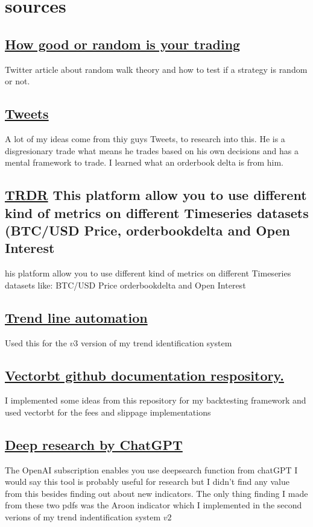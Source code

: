 \documentclass[12pt]{article}
\begin{document}
\section{sources}
{\small
\subsection{\href{https://x.com/HangukQuant/status/1930603876069335120}{How good or random is your trading}}
Twitter article about random walk theory and how to test if a strategy is random or not. 
\subsection{\href{https://x.com/abetrade/status/1941613701150188008}{Tweets}}
A lot of my ideas come from thiy guys Tweets, to research into this. He is a disgresionary trade what means he trades based on his own decisions and has a mental framework to trade. I learned what an orderbook delta is from him.
\subsection{\href{https://trdr.io/}{TRDR} This platform allow you to use different kind of metrics on different Timeseries datasets (BTC/USD Price, orderbookdelta  and Open Interest}his platform allow you to use different kind of metrics on different Timeseries datasets like: BTC/USD Price orderbookdelta  and Open Interest
\subsection{\href{https://github.com/neurotrader888/TrendLineAutomation}{Trend line automation}} Used this for the $v3$ version of my trend identification system
\subsection{\href{https://github.com/polakowo/vectorbt}{Vectorbt github documentation respository.}} I implemented some ideas from this repository for my backtesting framework and used vectorbt for the fees and slippage implementations


\subsection{\href{https://github.com/AJslashTracey/deep_research_chatGPT_03}{Deep research by ChatGPT}}
The OpenAI subscription enables you use deepsearch function from chatGPT I would say this tool is probably useful for research but I didn't find any value from this besides finding out about new indicators. The only thing finding I made from these two pdfs was the Aroon indicator which I implemented in the second verions of my trend indentification system $v2$


}
\end{document}
